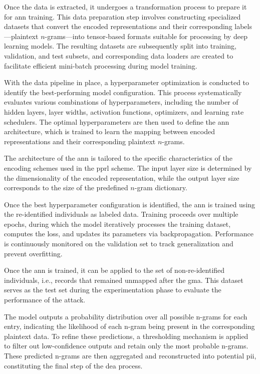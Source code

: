 Once the data is extracted, it undergoes a transformation process to prepare it for \ac{ann} training.
This data preparation step involves constructing specialized datasets that convert the encoded representations and their corresponding labels—plaintext $n$-grams—into tensor-based formats suitable for processing by deep learning models.
The resulting datasets are subsequently split into training, validation, and test subsets, and corresponding data loaders are created to facilitate efficient mini-batch processing during model training.

With the data pipeline in place, a hyperparameter optimization is conducted to identify the best-performing model configuration.
This process systematically evaluates various combinations of hyperparameters, including the number of hidden layers, layer widths, activation functions, optimizers, and learning rate schedulers.
The optimal hyperparameters are then used to define the \ac{ann} architecture, which is trained to learn the mapping between encoded representations and their corresponding plaintext $n$-grams.

The architecture of the \ac{ann} is tailored to the specific characteristics of the encoding schemes used in the \ac{pprl} scheme.
The input layer size is determined by the dimensionality of the encoded representation, while the output layer size corresponds to the size of the predefined $n$-gram dictionary.

Once the best hyperparameter configuration is identified, the \ac{ann} is trained using the re-identified individuals as labeled data.
Training proceeds over multiple epochs, during which the model iteratively processes the training dataset, computes the loss, and updates its parameters via backpropagation.
Performance is continuously monitored on the validation set to track generalization and prevent overfitting.

Once the \ac{ann} is trained, it can be applied to the set of non-re-identified individuals, i.e., records that remained unmapped after the \ac{gma}.
This dataset serves as the test set during the experimentation phase to evaluate the performance of the attack.

The model outputs a probability distribution over all possible n-grams for each entry, indicating the likelihood of each n-gram being present in the corresponding plaintext data.
To refine these predictions, a thresholding mechanism is applied to filter out low-confidence outputs and retain only the most probable n-grams.
These predicted n-grams are then aggregated and reconstructed into potential \ac{pii}, constituting the final step of the \ac{dea} process.

